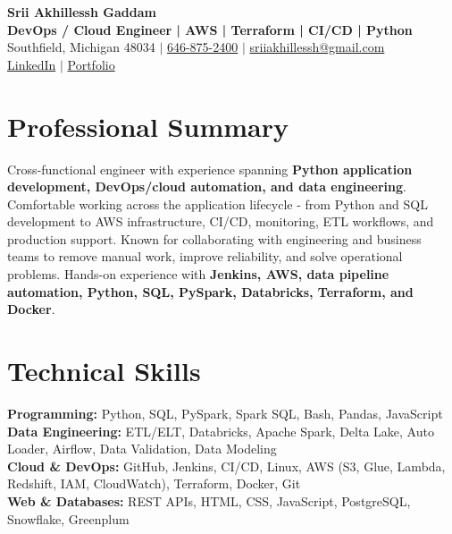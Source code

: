 \documentclass[letterpaper,10pt]{article}
\begin{document}
\fontsize{9.35pt}{10.45pt}\selectfont

\begin{center}
    {\LARGE \textbf{Srii Akhillessh Gaddam}} \\[-1pt]
    \textbf{DevOps / Cloud Engineer | AWS | Terraform | CI/CD | Python} \\[2pt]
    Southfield, Michigan 48034 $|$
    \href{tel:6468752400}{646-875-2400} $|$
    \href{mailto:sriiakhillessh@gmail.com}{sriiakhillessh@gmail.com} \\[1pt]
    \href{https://www.linkedin.com/in/srii-akhiilessh-gaddam-b48668191/}{LinkedIn} $|$
    \href{https://sriiakhillesshg.github.io/portfolio/}{Portfolio}
\end{center}
\vspace{-8pt}

\section{Professional Summary}
\small{Cross-functional engineer with experience spanning \textbf{Python application development, DevOps/cloud automation, and data engineering}. Comfortable working across the application lifecycle - from Python and SQL development to AWS infrastructure, CI/CD, monitoring, ETL workflows, and production support. Known for collaborating with engineering and business teams to remove manual work, improve reliability, and solve operational problems. Hands-on experience with \textbf{Jenkins, AWS, data pipeline automation, Python, SQL, PySpark, Databricks, Terraform, and Docker}.}

\section{Technical Skills}
\small{
\textbf{Programming:} Python, SQL, PySpark, Spark SQL, Bash, Pandas, JavaScript \\
\textbf{Data Engineering:} ETL/ELT, Databricks, Apache Spark, Delta Lake, Auto Loader, Airflow, Data Validation, Data Modeling \\
\textbf{Cloud \& DevOps:} GitHub, Jenkins, CI/CD, Linux, AWS (S3, Glue, Lambda, Redshift, IAM, CloudWatch), Terraform, Docker, Git \\
\textbf{Web \& Databases:} REST APIs, HTML, CSS, JavaScript, PostgreSQL, Snowflake, Greenplum
}
\end{document}
